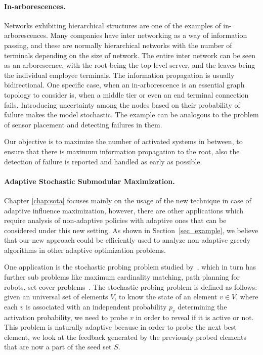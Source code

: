 \paragraph{In-arborescences.}
Networks exhibiting hierarchical structures are one of the examples of in-arborescences. Many companies have inter networking as a way of information passing, and these are normally hierarchical networks with the number of terminals depending on the size of network. 
The entire inter network can be seen as an arborescence, with the root being the top level server, and the leaves being the individual employee terminals. The information propagation is usually bidirectional. One specific case, when an in-arborescence is an essential graph topology to consider is, when a middle tier or even an end terminal connection fails. Introducing uncertainty among the nodes based on their probability of failure makes the model stochastic. The example can be analogous to the problem of sensor placement and detecting failures in them.

Our objective is to maximize the number of activated systems in between, to ensure that there is maximum information propagation to the root, also the detection of failure is reported and handled as early as possible.


\paragraph{Adaptive Stochastic Submodular Maximization.}
Chapter \ref{chap:sota} focuses mainly on the usage of the new technique in case of adaptive influence maximization, however, there are other applications which require analysis of non-adaptive policies with adaptive ones that can be considered under this new setting. As shown in Section~\ref{sec_example}, we believe that our new approach could be efficiently used to analyze non-adaptive greedy algorithms in other adaptive optimization problems.

One application is the stochastic probing problem studied by~\cite{Bradac19,Gupta2016,Gupta2017,gupta13}, which in turn has further sub problems like maximum cardinality matching, path planning for robots, set cover problems~\cite{DBLP:conf/latin/GoemansV06,DBLP:conf/icml/GuilloryB10}. The stochastic probing problem is defined as follows: given an universal set of elements $V$, to know the state of an element $v \in V$, where each $v$ is associated with an independent probability $p_v$ determining the activation probability, we need to probe $v$ in order to reveal if it is active or not. This problem is naturally adaptive because in order to probe the next best element, we look at the feedback generated by the previously probed elements that are now a part of the seed set $S$.




